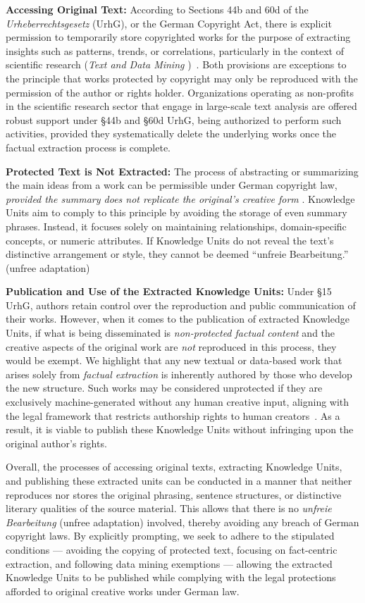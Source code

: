 \textbf{Accessing Original Text:} According to Sections 44b and 60d of the \emph{Urheberrechtsgesetz} (UrhG), or the German Copyright Act, there is explicit permission to temporarily store copyrighted works for the purpose of extracting insights such as patterns, trends, or correlations, particularly in the context of scientific research (\emph{Text and Data Mining} )~\citep{heidrich2023legal}. Both provisions are exceptions to the principle that works protected by copyright may only be reproduced with the permission of the author or rights holder. Organizations operating as non-profits in the scientific research sector that engage in large-scale text analysis are offered robust support under \S44b and \S60d UrhG, being authorized to perform such activities, provided they systematically delete the underlying works once the factual extraction process is complete.

\textbf{Protected Text is Not Extracted:} The process of abstracting or summarizing the main ideas from a work can be permissible under German copyright law, \emph{provided the summary does not replicate the original’s creative form} \citep{heidrich2023legal}. Knowledge Units aim to comply to this principle by avoiding the storage of even summary phrases. Instead, it focuses solely on maintaining relationships, domain-specific concepts, or numeric attributes. If Knowledge Units do not reveal the text’s distinctive arrangement or style, they cannot be deemed “unfreie Bearbeitung.” (unfree adaptation) 

\textbf{Publication and Use of the Extracted Knowledge Units:} Under \S15 UrhG, authors retain control over the reproduction and public communication of their works. However, when it comes to the publication of extracted Knowledge Units, if what is being disseminated is \emph{non-protected factual content} and the creative aspects of the original work are \emph{not} reproduced in this process, they would be exempt. We highlight that any new textual or data-based work that arises solely from \emph{factual extraction} is inherently authored by those who develop the new structure. Such works may be considered unprotected if they are exclusively machine-generated without any human creative input, aligning with the legal framework that restricts authorship rights to human creators~\cite{heidrich2023legal}. As a result, it is viable to publish these Knowledge Units without infringing upon the original author’s rights. 

Overall, the processes of accessing original texts, extracting Knowledge Units, and publishing these extracted units can be conducted in a manner that neither reproduces nor stores the original phrasing, sentence structures, or distinctive literary qualities of the source material. This allows that there is no \emph{unfreie Bearbeitung} (unfree adaptation) involved, thereby avoiding any breach of German copyright laws. By explicitly prompting, we seek to adhere to the stipulated conditions — avoiding the copying of protected text, focusing on fact-centric extraction, and following data mining exemptions — allowing the  extracted Knowledge Units to be published while complying with the legal protections afforded to original creative works under German law.

